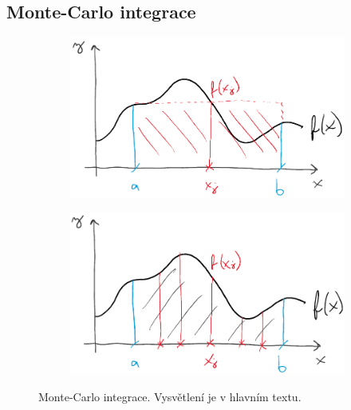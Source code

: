 \documentclass[a4paper,11pt,twoside]{article}
\theoremstyle{red}
\theoremstyle{green}
\begin{document}
    \subsection{Monte-Carlo integrace}
    \begin{figure}[!htbp]
        \begin{subfigure}{0.49\linewidth}
            \centering\includegraphics[width=\linewidth]{int1.png}
            \caption{}
        \end{subfigure}
        \hfill
        \begin{subfigure}{0.49\linewidth}
            \centering\includegraphics[width=\linewidth]{int2.png}
            \caption{}
        \end{subfigure}
        \caption{
            \protect\small
            Monte-Carlo integrace.
            Vysvětlení je v hlavním textu.
        }
        \label{fig:MCIntegral}
    \end{figure}
\end{document}
